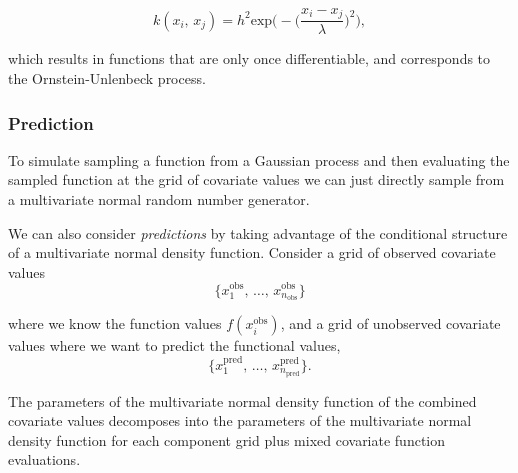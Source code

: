          \[k(x_{i}, \, x_{j}) = h^{2} \text{exp} \bigg(- \Big(\frac{x_i - x_j}{\lambda} \Big)^2 \bigg),\]

         which results in functions that are only once differentiable, and corresponds to the Ornstein-Unlenbeck process.

      \subsubsection{Prediction}

         \cite{Betancourt2020} To simulate sampling a function from a Gaussian process and then evaluating the sampled function at the grid of covariate values we can just directly sample from a multivariate normal random number generator.

         \vspace{1em}

         We can also consider \textit{predictions} by taking advantage of the conditional structure of a multivariate normal density function. Consider a grid of observed covariate values \[\{x_{1}^{\text{obs}}, \, \ldots, \, x_{n_{\text{obs}}}^{\text{obs}}\}\]

         where we know the function values \(f(x_{i}^{\text{obs}})\), and a grid of unobserved covariate values where we want to predict the functional values, \[\{x_{1}^{\text{pred}}, \, \ldots, \, x_{n_{\text{pred}}}^{\text{pred}}\}.\]

         The parameters of the multivariate normal density function of the combined covariate values decomposes into the parameters of the multivariate normal density function for each component grid plus mixed covariate function evaluations.

         \vspace{1em}

